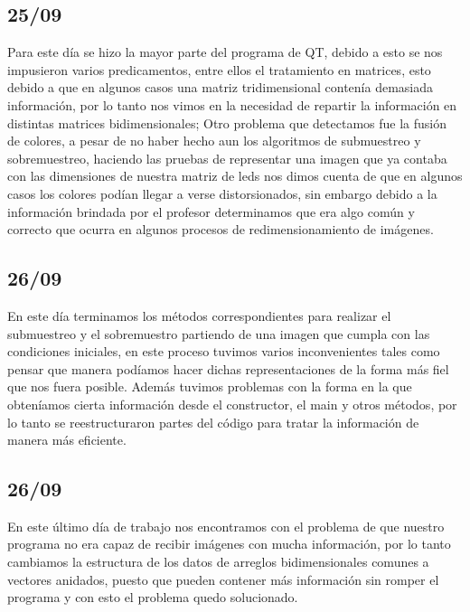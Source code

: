 \documentclass{article}
\begin{document}
    \begin{flushleft}
     \subsection{25/09}
     Para este día se hizo la mayor parte del programa de QT, debido a esto se nos impusieron varios predicamentos, entre ellos el tratamiento en matrices, esto debido a que en algunos casos una matriz tridimensional contenía demasiada información, por lo tanto nos vimos en la necesidad de repartir la información en distintas matrices bidimensionales; Otro problema que detectamos fue la fusión de colores, a pesar de no haber hecho aun los algoritmos de submuestreo y sobremuestreo, haciendo las pruebas de representar una imagen que ya contaba con las dimensiones de nuestra matriz de leds nos dimos cuenta de que en algunos casos los colores podían llegar a verse distorsionados, sin embargo debido a la información brindada por el profesor determinamos que era algo común y correcto que ocurra en algunos procesos de redimensionamiento de imágenes.
      \end{flushleft}
     \begin{flushleft}
     \subsection{26/09}   
     En este día terminamos los métodos correspondientes para realizar el submuestreo y el sobremuestro partiendo de una imagen que cumpla con las condiciones iniciales, en este proceso tuvimos varios inconvenientes tales como pensar que manera podíamos hacer dichas representaciones de la forma más fiel que nos fuera posible. Además tuvimos problemas con la forma en la que obteníamos cierta información desde el constructor, el main y otros métodos, por lo tanto se reestructuraron partes del código para tratar la información de manera más eficiente.  
     
    \end{flushleft}
    
    \begin{flushleft}
     \subsection{26/09}   
     En este último día de trabajo nos encontramos con el problema de que nuestro programa no era capaz de recibir imágenes con mucha información, por lo tanto cambiamos la estructura de los datos de arreglos bidimensionales comunes a vectores anidados, puesto que pueden contener más información sin romper el programa y con esto el problema quedo solucionado.
     
    \end{flushleft}
    
\end{document}
